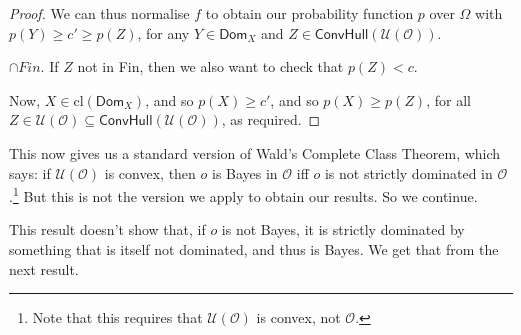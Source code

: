 \documentclass[a4paper,final]{article}
\newtheorem{corollary}[theorem]{Corollary}
\newcommand\cl{\mathrm{cl}}
\renewcommand\O{\mathcal{O}}
\newcommand\Uwald{\mathcal{U}} %
\newcommand{\Dom}{\mathsf{Dom}}
\newcommand{\todoold}[2][]{\todo[backgroundcolor=white,bordercolor=orange!10,linecolor=gray!10, #1,caption={},textcolor=gray]{Pre-rev: #2}}
\newcommand{\Conv}{\mathsf{ConvHull}}
\renewcommand{\geq}{\geqslant}
\newenvironment{CCM rewritten}
{\begingroup\color{blue}} %
{\endgroup}              %
\begin{document}
\begin{proof}
		
		We can thus normalise $f$ to obtain our probability function $p$ over $\Omega$ with $p(Y)\geq c' \geq p(Z)$, for any $Y\in \Dom_X $ and $Z\in \Conv(\Uwald(\O))$.\begin{infversion}
			$\cap Fin$. If $Z$ not in Fin, then we also want to check that $p(Z)<c$. 
		\end{infversion}
		
		Now, $X\in\cl(\Dom_X )$, and so $p(X)\geq c'$, and so $p(X) \geq p(Z)$, for all $Z\in \Uwald(\O)\subseteq \Conv(\Uwald(\O))$, as required.
	\end{proof}
	
		This now gives us a standard version of Wald's Complete Class Theorem, which says: if $\Uwald(\O)$ is convex, then $o$ is Bayes in $\O$ iff $o$ is not strictly dominated in $\O$.\footnote{Note that this requires that $\Uwald(\O)$ is convex, not $\O$.} But this is not the version we apply to obtain our results. So we continue.
	
	This result doesn't show that, if $o$ is not Bayes, it is strictly dominated by something that is itself not dominated, and thus is Bayes. We get that from the next result. 
	
	
\end{document}
